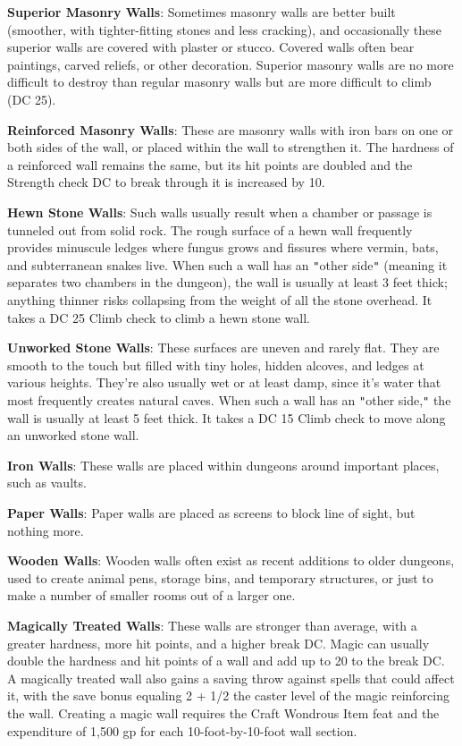 \textbf{Superior Masonry Walls}: Sometimes masonry walls are better built (smoother, with tighter-fitting stones and less cracking), and occasionally these superior walls are covered with plaster or stucco. Covered walls often bear paintings, carved reliefs, or other decoration. Superior masonry walls are no more difficult to destroy than regular masonry walls but are more difficult to climb (DC 25).
				
\textbf{Reinforced Masonry Walls}: These are masonry walls with iron bars on one or both sides of the wall, or placed within the wall to strengthen it. The hardness of a reinforced wall remains the same, but its hit points are doubled and the Strength check DC to break through it is increased by 10.
				
\textbf{Hewn Stone Walls}: Such walls usually result when a chamber or passage is tunneled out from solid rock. The rough surface of a hewn wall frequently provides minuscule ledges where fungus grows and fissures where vermin, bats, and subterranean snakes live. When such a wall has an \texttt{{}"{}}other side\texttt{{}"{}} (meaning it separates two chambers in the dungeon), the wall is usually at least 3 feet thick; anything thinner risks collapsing from the weight of all the stone overhead. It takes a DC 25 Climb check to climb a hewn stone wall.
				
\textbf{Unworked Stone Walls}: These surfaces are uneven and rarely flat. They are smooth to the touch but filled with tiny holes, hidden alcoves, and ledges at various heights. They're also usually wet or at least damp, since it's water that most frequently creates natural caves. When such a wall has an \texttt{{}"{}}other side,\texttt{{}"{}} the wall is usually at least 5 feet thick. It takes a DC 15 Climb check to move along an unworked stone wall. 
				
\textbf{Iron Walls}: These walls are placed within dungeons around important places, such as vaults. 
				
\textbf{Paper Walls}: Paper walls are placed as screens to block line of sight, but nothing more.
				
\textbf{Wooden Walls}: Wooden walls often exist as recent additions to older dungeons, used to create animal pens, storage bins, and temporary structures, or just to make a number of smaller rooms out of a larger one.
				
\textbf{Magically Treated Walls}: These walls are stronger than average, with a greater hardness, more hit points, and a higher break DC. Magic can usually double the hardness and hit points of a wall and add up to 20 to the break DC. A magically treated wall also gains a saving throw against spells that could affect it, with the save bonus equaling 2 + 1/2 the caster level of the magic reinforcing the wall. Creating a magic wall requires the Craft Wondrous Item feat and the expenditure of 1,500 gp for each 10-foot-by-10-foot wall section.
				
